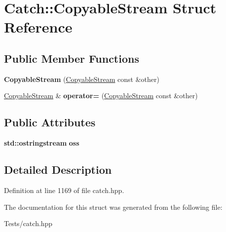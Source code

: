 \hypertarget{struct_catch_1_1_copyable_stream}{}\section{Catch\+:\+:Copyable\+Stream Struct Reference}
\label{struct_catch_1_1_copyable_stream}
\subsection*{Public Member Functions}
\begin{DoxyCompactItemize}
\item 
\mbox{\label{struct_catch_1_1_copyable_stream_a0e72dc16240653f52c17106f4bf34da8}} 
{\bfseries Copyable\+Stream} (\hyperlink{struct_catch_1_1_copyable_stream}{Copyable\+Stream} const \&other)
\item 
\mbox{\label{struct_catch_1_1_copyable_stream_a1760fa29b38011c5845171260bec0966}} 
\hyperlink{struct_catch_1_1_copyable_stream}{Copyable\+Stream} \& {\bfseries operator=} (\hyperlink{struct_catch_1_1_copyable_stream}{Copyable\+Stream} const \&other)
\end{DoxyCompactItemize}
\subsection*{Public Attributes}
\begin{DoxyCompactItemize}
\item 
\mbox{\label{struct_catch_1_1_copyable_stream_ae123fb4d673e7d7a13a3c5f6bc5d426c}} 
\textbf{ std\+::ostringstream} {\bfseries oss}
\end{DoxyCompactItemize}


\subsection{Detailed Description}


Definition at line 1169 of file catch.\+hpp.



The documentation for this struct was generated from the following file\+:\begin{DoxyCompactItemize}
\item 
Tests/catch.\+hpp\end{DoxyCompactItemize}
